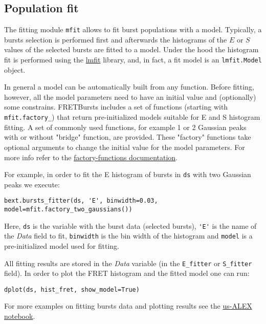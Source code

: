 \subsection{Population fit}
\label{sec:fretfit}

The fitting module \verb|mfit| allows to fit burst populations with a model.
Typically, a bursts selection is performed first and afterwards the histograms of
the $E$ or $S$ values of the selected bursts are fitted to a model. Under the
hood the histogram fit is performed using the
\href{http://lmfit.github.io/lmfit-py/}{lmfit} library, and, in fact, 
a fit model is an \verb|lmfit.Model| object.

In general a model can be automatically built from any function. Before fitting,
however, all the model parameters need to have an initial value and (optionally)
some constrains. FRETBursts includes a set of functions (starting with
\verb|mfit.factory_|) that return pre-initialized models suitable for E and S
histogram fitting. A set of commonly used functions, for example 1 or 2 Gaussian
peaks with or without "bridge" function, are provided. These "factory" functions
take optional arguments to change the initial value for the model parameters.
For more info refer to the
\href{http://fretbursts.readthedocs.org/en/latest/mfit.html#model-factory-functions}{factory-functions documentation}.

For example, in order to fit the E histogram of bursts in \verb|ds| with two
Gaussian peaks we execute:

\begin{verbatim}
bext.bursts_fitter(ds, 'E', binwidth=0.03, model=mfit.factory_two_gaussians())
\end{verbatim}

Here, \verb|ds| is the variable with the burst data (selected bursts),
\verb|'E'| is the name of the \textit{Data} field to fit, \verb|binwidth| is the bin
width of the histogram and \verb|model| is a pre-initialized model used for
fitting.

All fitting results are stored in the \textit{Data} variable (in the \verb|E_fitter| or
\verb|S_fitter| field).
In order to plot the FRET histogram and the fitted model one can run:

\begin{verbatim}
dplot(ds, hist_fret, show_model=True)
\end{verbatim}

For more examples on fitting bursts data and plotting results see the
\href{http://nbviewer.ipython.org/urls/raw.github.com/tritemio/FRETBursts_notebooks/master/notebooks/FRETBursts\%2520-\%2520us-ALEX\%2520smFRET\%2520burst\%2520analysis.ipynb}{us-ALEX notebook}.

